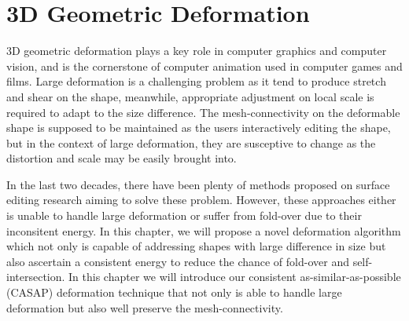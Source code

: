\ifx\isEmbedded\undefined


\fi
\chapter{3D Geometric Deformation}
\label{chap:landmark}
3D geometric deformation plays a key role in computer graphics and computer vision, and is the cornerstone of computer animation used in computer games and films. Large deformation is a challenging problem as it tend to produce stretch and shear on the shape, meanwhile, appropriate adjustment on local scale is required to adapt to the size difference. The mesh-connectivity on the deformable shape is supposed to be maintained as the users interactively editing the shape, but in the context of large deformation, they are susceptive to change as the distortion and scale may be easily brought into.

In the last two decades, there have been plenty of methods proposed on surface editing research aiming to solve these problem. However, these approaches either is unable to handle large deformation or suffer from fold-over due to their inconsitent energy. In this chapter, we will propose a novel deformation algorithm which not only is capable of addressing shapes with large difference in size but also ascertain a consistent energy to reduce the chance of fold-over and self-intersection. In this chapter we will introduce our consistent as-similar-as-possible (CASAP) deformation technique that not only is able to handle large deformation but also well preserve the mesh-connectivity.


